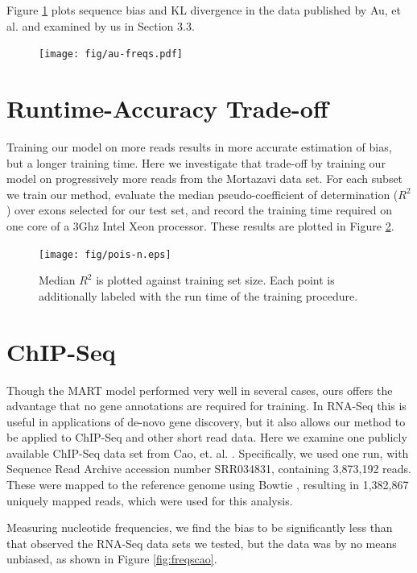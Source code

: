 \documentclass[letterpaper]{article}
\begin{document}
Figure \ref{fig:aufreqs} plots sequence bias and KL divergence in the data
published by Au, et al. \cite{Au2010} and examined by us in Section 3.3.

\begin{figure}[H]
\centerline{\texttt{[image: fig/au-freqs.pdf]}}
\caption{}
\label{fig:aufreqs}
\end{figure}


\section{Runtime-Accuracy Trade-off}

Training our model on more reads results in more accurate estimation of bias,
but a longer training time. Here we investigate that trade-off by training our
model on progressively more reads from the Mortazavi data set. For each subset
we train our method, evaluate the median pseudo-coefficient of determination
($R^2$) over exons selected for our test set, and record the training time
required on one core of a 3Ghz Intel Xeon processor. These results are plotted
in Figure \ref{fig:poisn}.

\begin{figure}[H]
\texttt{[image: fig/pois-n.eps]}
\caption{Median $R^2$ is plotted against training set size. Each point is
additionally labeled with the run time of the training procedure.}
\label{fig:poisn}
\end{figure}


\section{ChIP-Seq}

Though the MART model \cite{Li2010} performed very well in several cases, ours
offers the advantage that no gene annotations are required for training.  In
RNA-Seq this is useful in applications of de-novo gene discovery, but it also
allows our method to be applied to ChIP-Seq and other short read data. Here we
examine one publicly available ChIP-Seq data set from Cao, et. al.
\cite{Cao2010}. Specifically, we used one run, with Sequence Read Archive
accession number SRR034831, containing 3,873,192 reads. These were mapped to the
reference genome using Bowtie \cite{Langmead2009}, resulting in 1,382,867
uniquely mapped reads, which were used for this analysis.

Measuring nucleotide frequencies, we find the bias to be significantly less
than that observed the RNA-Seq data sets we tested, but the data was by no means
unbiased, as shown in Figure \ref{fig:freqscao}.
\end{document}
